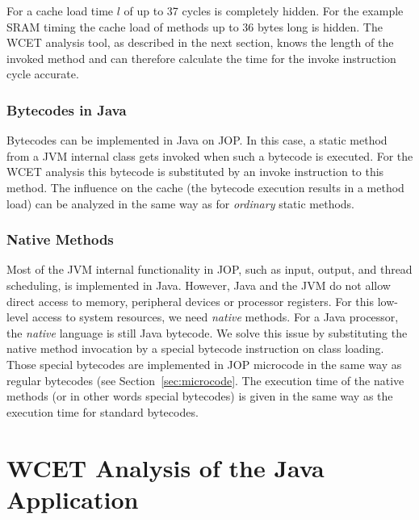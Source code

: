 For  a cache load time $l$ of up to 37 cycles is
completely hidden. For the example SRAM timing the cache load of
methods up to 36 bytes long is hidden. The WCET analysis tool, as
described in the next section, knows the length of the invoked method
and can therefore calculate the time for the invoke instruction cycle
accurate.

\subsubsection{Bytecodes in Java}

Bytecodes can be implemented in Java on JOP. In this case, a static
method from a JVM internal class gets invoked when such a bytecode is
executed. For the WCET analysis this bytecode is substituted by an
invoke instruction to this method. The influence on the cache (the
bytecode execution results in a method load) can be analyzed in the
same way as for \emph{ordinary} static methods.


\subsubsection{Native Methods}

Most of the JVM internal functionality in JOP, such as input, output,
and thread scheduling, is implemented in Java. However, Java and the
JVM do not allow direct access to memory, peripheral devices or
processor registers. For this low-level access to system resources,
we need \emph{native} methods. For a Java processor, the
\emph{native} language is still Java bytecode. We solve this issue by
substituting the native method invocation by a special bytecode
instruction on class loading. Those special bytecodes are implemented
in JOP microcode in the same way as regular bytecodes (see
Section~\ref{sec:microcode}. The execution time of the native methods
(or in other words special bytecodes) is given in the same way as the
execution time for standard bytecodes.

\section{WCET Analysis of the Java Application}
\label{sec:wcet:app}


